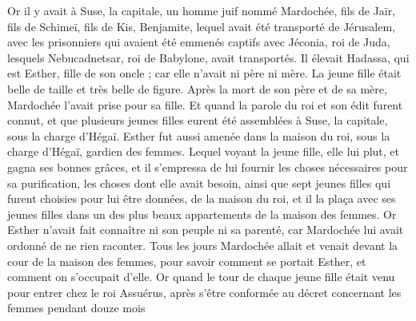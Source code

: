 \begin{multicols}{2}
Or il y avait à Suse, la capitale, un homme juif nommé Mardochée, fils de Jaïr, fils de Schimeï, fils de Kis, Benjamite,
lequel avait été transporté de Jérusalem, avec les prisonniers qui avaient été emmenés captifs avec Jéconia, roi de Juda, lesquels Nebucadnetsar, roi de Babylone, avait transportés.
Il élevait Hadassa, qui est Esther, fille de son oncle ; car elle n'avait ni père ni mère. La jeune fille était belle de taille et très belle de figure. Après la mort de son père et de sa mère, Mardochée l'avait prise pour sa fille.
Et quand la parole du roi et son édit furent connut, et que plusieurs jeunes filles eurent été assemblées à Suse, la capitale, sous la charge d'Hégaï. Esther fut aussi amenée dans la maison du roi, sous la charge d'Hégaï, gardien des femmes.
Lequel voyant la jeune fille, elle lui plut, et gagna ses bonnes grâces, et il s’empressa de lui fournir les choses nécessaires pour sa purification, les choses dont elle avait besoin, ainsi que sept jeunes filles qui furent choisies pour lui être données, de la maison du roi, et il la plaça avec ses jeunes filles dans un des plus beaux appartements de la maison des femmes.
Or Esther n’avait fait connaître ni son peuple ni sa parenté, car Mardochée lui avait ordonné de ne rien raconter.
Tous les jours Mardochée allait et venait devant la cour de la maison des femmes, pour savoir comment se portait Esther, et comment on s’occupait d'elle.
Or quand le tour de chaque jeune fille était venu pour entrer chez le roi Assuérus, après s’être conformée au décret concernant les femmes pendant douze mois
\end{multicols}
